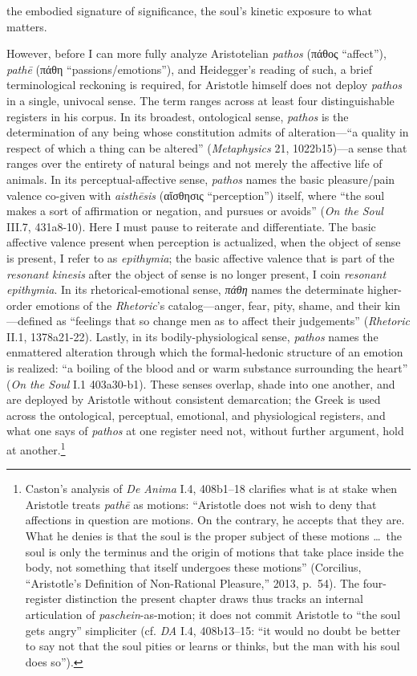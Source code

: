 \documentclass{article}
\newcommand{\gk}[1]{{\greekfont #1}}
\begin{document}
the embodied signature of significance, the soul’s kinetic exposure to what matters. 

However, before I can more fully analyze Aristotelian \textit{pathos} (\gk{πάθος} ``affect''), \textit{pathē} (\gk{πάθη}  ``passions/emotions''), and Heidegger's reading of such, a brief terminological reckoning is required, for Aristotle himself does not deploy \textit{pathos} in a single, univocal sense. The term ranges across at least four distinguishable registers in his corpus. In its broadest, ontological sense, \textit{pathos} is the determination of any being whose constitution admits of alteration---``a quality in respect of which a thing can be altered'' (\textit{Metaphysics} 21, 1022b15)---a sense that ranges over the entirety of natural beings and not merely the affective life of animals. In its perceptual-affective sense, \textit{pathos} names the basic pleasure/pain valence co-given with \textit{aisthēsis} (\gk{αἴσθησις} ``perception'') itself, where ``the soul makes a sort of affirmation or negation, and pursues or avoids'' (\textit{On the Soul} III.7, 431a8-10). Here I must pause to reiterate and differentiate. The basic affective valence present when perception is actualized, when the object of sense is present, I refer to as \textit{epithymia}; the basic affective valence that is part of the \textit{resonant kinesis} after the object of sense is no longer present, I coin \textit{resonant epithymia}. In its rhetorical-emotional sense, \textit{πάθη} names the determinate higher-order emotions of the \textit{Rhetoric}'s catalog---anger, fear, pity, shame, and their kin---defined as ``feelings that so change men as to affect their judgements'' (\textit{Rhetoric} II.1, 1378a21-22). Lastly, in its bodily-physiological sense, \textit{pathos} names the enmattered alteration through which the formal-hedonic structure of an emotion is realized: ``a boiling of the blood and or warm substance surrounding the heart'' (\textit{On the Soul} I.1 403a30-b1). These senses overlap, shade into one another, and are deployed by Aristotle without consistent demarcation; the Greek is used across the ontological, perceptual, emotional, and physiological registers, and what one says of \textit{pathos} at one register need not, without further argument, hold at another.\footnote{Caston's analysis of \textit{De Anima} I.4, 408b1--18 clarifies what is at stake when Aristotle treats \textit{pathē} as motions: ``Aristotle does not wish to deny that affections in question are motions. On the contrary, he accepts that they are. What he denies is that the soul is the proper subject of these motions \ldots\ the soul is only the terminus and the origin of motions that take place inside the body, not something that itself undergoes these motions'' (Corcilius, ``Aristotle's Definition of Non-Rational Pleasure,'' 2013, p.~54). The four-register distinction the present chapter draws thus tracks an internal articulation of \textit{paschein}-as-motion; it does not commit Aristotle to ``the soul gets angry'' simpliciter (cf. \textit{DA} I.4, 408b13--15: ``it would no doubt be better to say not that the soul pities or learns or thinks, but the man with his soul does so'').}
\end{document}
